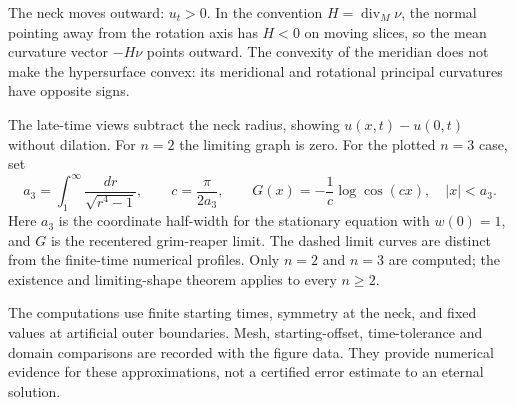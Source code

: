 \begin{example}
The neck moves outward: $u_t>0$. In the convention $H=\operatorname{div}_M\nu$, the normal pointing away from the rotation axis has $H<0$ on moving slices, so the mean curvature vector $-H\nu$ points outward. The convexity of the meridian does not make the hypersurface convex: its meridional and rotational principal curvatures have opposite signs.

The late-time views subtract the neck radius, showing $u(x,t)-u(0,t)$ without dilation. For $n=2$ the limiting graph is zero. For the plotted $n=3$ case, set
\[
 a_3=\int_1^\infty\frac{dr}{\sqrt{r^4-1}},\qquad
 c=\frac{\pi}{2a_3},\qquad
 G(x)=-\frac{1}{c}\log\cos(cx),\quad |x|<a_3.
\]
Here $a_3$ is the coordinate half-width for the stationary equation with $w(0)=1$, and $G$ is the recentered grim-reaper limit. The dashed limit curves are distinct from the finite-time numerical profiles. Only $n=2$ and $n=3$ are computed; the existence and limiting-shape theorem applies to every $n\geq2$.

The computations use finite starting times, symmetry at the neck, and fixed values at artificial outer boundaries. Mesh, starting-offset, time-tolerance and domain comparisons are recorded with the figure data. They provide numerical evidence for these approximations, not a certified error estimate to an eternal solution.
\end{example}

